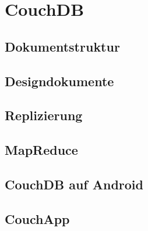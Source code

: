 ﻿\section{CouchDB}

\subsection{Dokumentstruktur}

\subsection{Designdokumente}

\subsection{Replizierung}

\subsection{MapReduce}

\subsection{CouchDB auf Android}

\subsection{CouchApp}

